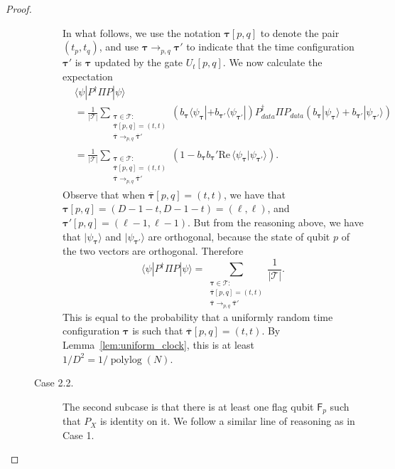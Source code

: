 \documentclass[11pt,letterpaper]{article}
\theoremstyle{definition}
\theoremstyle{remark}
\newcommand{\Paren}[1]{\left(#1\right)}
\DeclareMathOperator{\polylog}{polylog}
\newcommand{\cT}{\mathcal T}
\numberwithin{equation}{section}
\theoremstyle{definition}
\newcommand{\comp}[1]{\overline{#1}}
\newcommand{\ket}[1]{|#1\rangle}
\newcommand{\bra}[1]{\langle#1|}
\newcommand{\ip}[2]{\langle #1 | #2 \rangle}
\newcommand{\sF}{{\mathsf{F}}}
\newcommand{\timeconfig}{{\bm{\tau}}}
\begin{document}
\begin{proof}
\begin{description}
\begin{description}
  In what follows, we use the notation $\timeconfig[p,q]$ to denote the pair $(t_p,t_q)$, and use $\timeconfig \to_{p,q} \timeconfig'$ to indicate that the time configuration $\timeconfig'$ is $\timeconfig$ updated by the gate $U_t[p,q]$. We now calculate the expectation 
  \begin{align}
    &\bra{\psi} P^\dagger \Pi P \ket{\psi} \\
    &= \frac{1}{|\cT|} \sum_{\substack{\timeconfig \in \cT : \\ \comp{\timeconfig}[p,q] = (t,t) \\ \comp{\timeconfig} \to_{p,q} \comp{\timeconfig}'}} 
    \Paren{ b_\timeconfig \bra{\psi_{\timeconfig}} + b_{\timeconfig'} \bra{\psi_{\timeconfig'}} } P_{data}^\dagger \Pi P_{data}  \Paren{ b_\timeconfig \ket{\psi_{\timeconfig}} + b_{\timeconfig'} \ket{\psi_{\timeconfig'}} } \\
    &= \frac{1}{|\cT|} \sum_{\substack{\timeconfig \in \cT : \\ \comp{\timeconfig}[p,q] = (t,t) \\ \comp{\timeconfig} \to_{p,q} \comp{\timeconfig}'}}
    \Paren{1 - b_\timeconfig b_\timeconfig' \mathrm{Re} \, \ip{\psi_{\timeconfig}}{\psi_{\timeconfig'}}  }.
  \end{align}
  Observe that when $\comp{\timeconfig}[p,q] = (t,t)$, we have that $\timeconfig[p,q] = (D - 1 -t,D-1-t) = (\ell,\ell)$, and $\timeconfig'[p,q] = (\ell-1,\ell-1)$. But from the reasoning above, we have that $\ket{\psi_\timeconfig}$ and $\ket{\psi_{\timeconfig'}}$ are orthogonal, because the state of qubit $p$ of the two vectors are orthogonal. Therefore 
  \begin{equation}
    \bra{\psi} P^\dagger \Pi P \ket{\psi} = \sum_{\substack{\timeconfig \in \cT : \\ \comp{\timeconfig}[p,q] = (t,t) \\ \comp{\timeconfig} \to_{p,q} \comp{\timeconfig}'}} \frac{1}{|\cT|} .
  \end{equation}
  This is equal to the probability that a uniformly random time configuration $\timeconfig$ is such that $\comp{\timeconfig}[p,q] = (t,t)$. By Lemma~\ref{lem:uniform_clock}, this is at least $1/D^2 = 1/\polylog(N)$.
  
%
  
    
    \item[Case 2.2.] The second subcase is that there is at least one flag qubit $\sF_p$ such that $P_X$ is identity on it. We follow a similar line of reasoning as in Case 1.
        

\end{description}
\end{description}
\end{proof}
\end{document}
